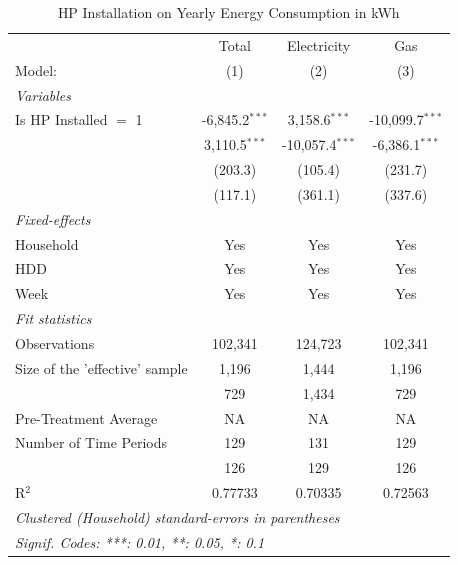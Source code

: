 
\begin{table}[htbp]
   \caption{HP Installation on Yearly Energy Consumption in kWh}
   \centering
   \begin{tabular}{lccc}
      \tabularnewline \midrule \midrule
                                     & Total            & Electricity     & Gas \\   
      Model:                         & (1)              & (2)             & (3)\\  
      \midrule
      \emph{Variables}\\
      Is HP Installed $=$ 1           &  -6,845.2$^{***}$  &  3,158.6$^{***}$  &  -10,099.7$^{***}$\\    & 3,110.5$^{***}$ & -10,057.4$^{***}$ & -6,386.1$^{***}$ \\
                                      &  (203.3)           &  (105.4)          &  (231.7)\\    & (117.1) & (361.1) & (337.6) \\
      \midrule
      \emph{Fixed-effects}\\
      Household                      & Yes              & Yes             & Yes\\  
      HDD                            & Yes              & Yes             & Yes\\  
      Week                           & Yes              & Yes             & Yes\\  
      \midrule
      \emph{Fit statistics}\\
      Observations                   & 102,341          & 124,723         & 102,341\\  
      Size of the 'effective' sample  &  1,196             &  1,444            &  1,196\\   & 729 & 1,434 & 729 \\
      Pre-Treatment Average          & NA               & NA              & NA\\  
      Number of Time Periods          &  129               &  131              &  129\\   & 126 & 129 & 126 \\
      R$^2$                          & 0.77733          & 0.70335         & 0.72563\\  
      \midrule \midrule
      \multicolumn{4}{l}{\emph{Clustered (Household) standard-errors in parentheses}}\\
      \multicolumn{4}{l}{\emph{Signif. Codes: ***: 0.01, **: 0.05, *: 0.1}}\\
   \end{tabular}
\end{table}


